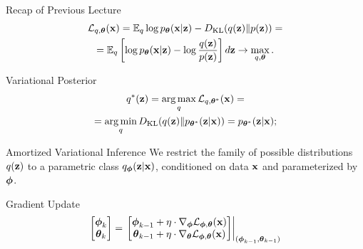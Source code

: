\documentclass{beamer}
\begin{document}
\begin{frame}{Recap of Previous Lecture}
	\vspace{-0.5cm}
	\begin{multline*}
		\mathcal{L}_{q, \boldsymbol{\theta}}(\mathbf{x})  =  \mathbb{E}_{q} \log p_{\boldsymbol{\theta}}(\mathbf{x} | \mathbf{z}) - D_\mathrm{KL} (q(\mathbf{z}) \| p(\mathbf{z})) = \\ = \mathbb{E}_q \left[ \log p_{\boldsymbol{\theta}}(\mathbf{x} | \mathbf{z}) - \log \frac{q(\mathbf{z})}{p(\mathbf{z})} \right]d\mathbf{z} \rightarrow \max_{q, \boldsymbol{\theta}}.
	\end{multline*}
	\vspace{-0.5cm}
	\begin{block}{Variational Posterior}
		\vspace{-0.7cm}
		\begin{multline*}
			q^*(\mathbf{z}) = \operatorname*{arg\,max}_q \mathcal{L}_{q, \boldsymbol{\theta}^*}(\mathbf{x}) = \\
			= \operatorname*{arg\,min}_q D_\mathrm{KL}(q(\mathbf{z}) \| p_{\boldsymbol{\theta}^*}(\mathbf{z} | \mathbf{x})) = p_{\boldsymbol{\theta}^*}(\mathbf{z}| \mathbf{x});
		\end{multline*}
		\vspace{-0.7cm}
	\end{block}
	\begin{block}{Amortized Variational Inference}
			We restrict the family of possible distributions $q(\mathbf{z})$ to a parametric class $q_{\boldsymbol{\phi}}(\mathbf{z}| \mathbf{x})$, {\color{teal}conditioned on data $\mathbf{x}$} and {\color{violet}parameterized by $\boldsymbol{\phi}$}.
	\end{block}
	\begin{block}{Gradient Update}
		\[
			\begin{bmatrix}
				\boldsymbol{\phi}_k \\
				\boldsymbol{\theta}_k
			\end{bmatrix}
			= \left.
			\begin{bmatrix}
				\boldsymbol{\phi}_{k-1} + \eta \cdot \nabla_{\boldsymbol{\phi}} \mathcal{L}_{\boldsymbol{\phi}, \boldsymbol{\theta}}(\mathbf{x}) \\
				\boldsymbol{\theta}_{k-1} + \eta \cdot \nabla_{\boldsymbol{\theta}} \mathcal{L}_{\boldsymbol{\phi}, \boldsymbol{\theta}}(\mathbf{x})
			\end{bmatrix}
			\right|_{(\boldsymbol{\phi}_{k-1}, \boldsymbol{\theta}_{k-1})}
		\]
	\end{block}
\end{frame}
\end{document}

